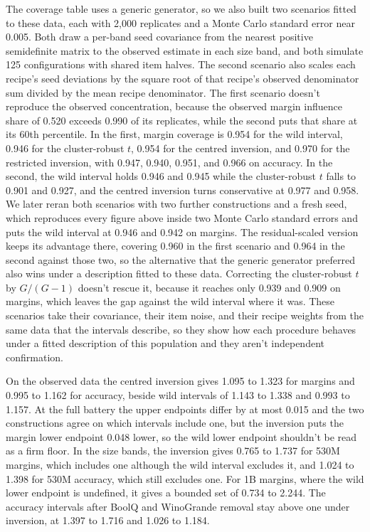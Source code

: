 The coverage table uses a generic generator, so we also built two scenarios fitted to these data, each with 2,000 replicates and a Monte Carlo standard error near 0.005. Both draw a per-band seed covariance from the nearest positive semidefinite matrix to the observed estimate in each size band, and both simulate 125 configurations with shared item halves. The second scenario also scales each recipe's seed deviations by the square root of that recipe's observed denominator sum divided by the mean recipe denominator. The first scenario doesn't reproduce the observed concentration, because the observed margin influence share of 0.520 exceeds 0.990 of its replicates, while the second puts that share at its 60th percentile. In the first, margin coverage is 0.954 for the wild interval, 0.946 for the cluster-robust $t$, 0.954 for the centred inversion, and 0.970 for the restricted inversion, with 0.947, 0.940, 0.951, and 0.966 on accuracy. In the second, the wild interval holds 0.946 and 0.945 while the cluster-robust $t$ falls to 0.901 and 0.927, and the centred inversion turns conservative at 0.977 and 0.958. We later reran both scenarios with two further constructions and a fresh seed, which reproduces every figure above inside two Monte Carlo standard errors and puts the wild interval at 0.946 and 0.942 on margins. The residual-scaled version keeps its advantage there, covering 0.960 in the first scenario and 0.964 in the second against those two, so the alternative that the generic generator preferred also wins under a description fitted to these data. Correcting the cluster-robust $t$ by $G/(G-1)$ doesn't rescue it, because it reaches only 0.939 and 0.909 on margins, which leaves the gap against the wild interval where it was. These scenarios take their covariance, their item noise, and their recipe weights from the same data that the intervals describe, so they show how each procedure behaves under a fitted description of this population and they aren't independent confirmation.

On the observed data the centred inversion gives 1.095 to 1.323 for margins and 0.995 to 1.162 for accuracy, beside wild intervals of 1.143 to 1.338 and 0.993 to 1.157. At the full battery the upper endpoints differ by at most 0.015 and the two constructions agree on which intervals include one, but the inversion puts the margin lower endpoint 0.048 lower, so the wild lower endpoint shouldn't be read as a firm floor. In the size bands, the inversion gives 0.765 to 1.737 for 530M margins, which includes one although the wild interval excludes it, and 1.024 to 1.398 for 530M accuracy, which still excludes one. For 1B margins, where the wild lower endpoint is undefined, it gives a bounded set of 0.734 to 2.244. The accuracy intervals after BoolQ and WinoGrande removal stay above one under inversion, at 1.397 to 1.716 and 1.026 to 1.184.

